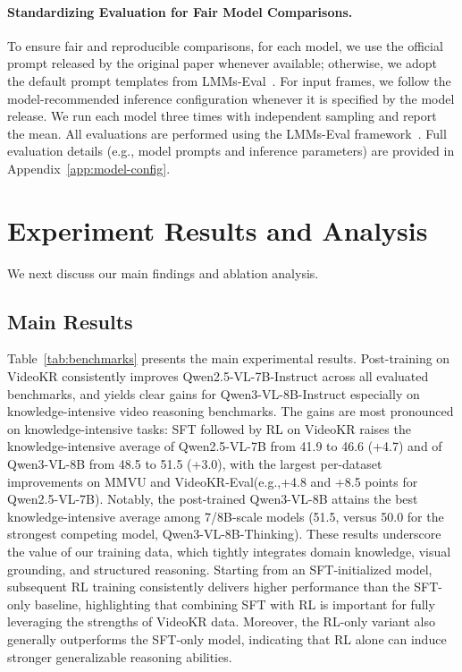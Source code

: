 \documentclass{llmxive}
\providecommand{\eg}{e.g.,\xspace}
\providecommand{\data}{VideoKR\xspace}
\providecommand{\eval}{VideoKR-Eval\xspace}
\providecommand{\ours}{VideoKR\xspace}
\begin{document}
\vspace{-8pt}
\paragraph{Standardizing Evaluation for Fair Model Comparisons.}
To ensure fair and reproducible comparisons, for each model, we use the official prompt released by the original paper whenever available; otherwise, we adopt the default prompt templates from LMMs-Eval~\cite{lmms_eval}. For input frames, we follow the model-recommended inference configuration whenever it is specified by the model release. 
We run each model three times with independent sampling and report the mean.
All evaluations are performed using the LMMs-Eval framework~\cite{lmms_eval}.
Full evaluation details (\eg model prompts and inference parameters) are provided in Appendix~\ref{app:model-config}.






\section{Experiment Results and Analysis}\label{sec:6}
We next discuss our main findings and ablation analysis.
\subsection{Main Results}
Table~\ref{tab:benchmarks} presents the main experimental results. 
Post-training on \data consistently improves Qwen2.5-VL-7B-Instruct across all evaluated benchmarks, and yields clear gains for Qwen3-VL-8B-Instruct especially on knowledge-intensive video reasoning benchmarks.
The gains are most pronounced on knowledge-intensive tasks: SFT followed by RL on \ours raises the knowledge-intensive average of Qwen2.5-VL-7B from 41.9 to 46.6 (+4.7) and of Qwen3-VL-8B from 48.5 to 51.5 (+3.0), with the largest per-dataset improvements on MMVU and \eval (\eg +4.8 and +8.5 points for Qwen2.5-VL-7B).
Notably, the post-trained Qwen3-VL-8B attains the best knowledge-intensive average among 7/8B-scale models (51.5, versus 50.0 for the strongest competing model, Qwen3-VL-8B-Thinking).
These results underscore the value of our training data, which tightly integrates domain knowledge, visual grounding, and structured reasoning.
Starting from an SFT-initialized model, subsequent RL training consistently delivers higher performance than the SFT-only baseline, highlighting that combining SFT with RL is important for fully leveraging the strengths of \ours data.
Moreover, the RL-only variant also generally outperforms the SFT-only model, indicating that RL alone can induce stronger generalizable reasoning abilities.
\end{document}
